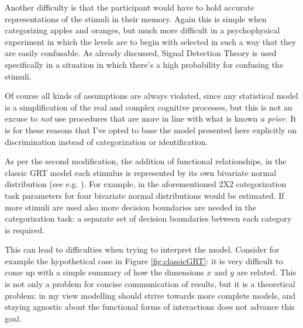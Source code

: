 \documentclass{article}\usepackage{knitr}
\begin{document}
Another difficulty is that the participant would have to hold accurate representations of the stimuli in their memory. Again this is simple when categorizing apples and oranges, but much more difficult in a psychophysical experiment in which the levels are to begin with selected in such a way that they are easily confusable. As already discussed, Signal Detection Theory is used specifically in a situation in which there's a high probability for confusing the stimuli. 

Of course all kinds of assumptions are always violated, since any statistical model is a simplification of the real and complex cognitive processes, but this is not an excuse to \textit{not} use procedures that are more in line with what is known \textit{a prior}. It is for these reasons that I've opted to base the model presented here explicitly on discrimination instead of categorization or identification.

As per the second modification, the addition of functional relationships, in the classic GRT model each stimulus is represented by its own bivariate  normal distribution (see e.g. \cite{ashby2015}). For example, in the aforementioned 2X2 categorization task parameters for four bivariate normal distributions would be estimated. If more stimuli are used also more decision boundaries are needed in the categorization task: a separate set of decision boundaries between each category is required. 

This can lead to difficulties when trying to interpret the model. Consider for example the hypothetical case in Figure \ref{fig:classicGRT}: it is very difficult to come up with a simple summary of how the dimensions $x$ and $y$ are related. This is not only a problem for concise communication of results, but it is a theoretical problem: in my view modelling should strive towards more complete models, and staying agnostic about the functional forms of interactions does not advance this goal. 
\end{document}
